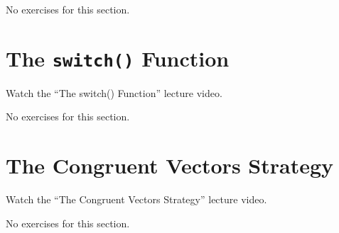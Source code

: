 \documentclass[
]{article}
\begin{document}
No exercises for this section.

\hypertarget{the-switch-function}{%
\section{\texorpdfstring{The \texttt{switch()}
Function}{The switch() Function}}\label{the-switch-function}}

Watch the ``The switch() Function'' lecture video.

No exercises for this section.

\hypertarget{the-congruent-vectors-strategy}{%
\section{The Congruent Vectors
Strategy}\label{the-congruent-vectors-strategy}}

Watch the ``The Congruent Vectors Strategy'' lecture video.

No exercises for this section.
\end{document}
